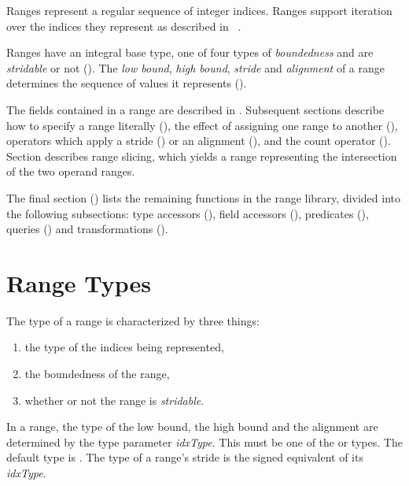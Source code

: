 \label{Ranges}

Ranges represent a regular sequence of integer indices.  
Ranges support iteration over the
indices they represent as described in ~.

Ranges have an integral base type, one of four types of \emph{boundedness} and
are \emph{stridable} or not ().  The \emph{low
bound}, \emph{high bound}, \emph{stride} and \emph{alignment} of a range
determines the sequence of values it represents ().

The fields contained in a range are described in .
Subsequent sections describe how to specify a range literally
(), the effect of assigning one range to another
(), operators which apply a stride
() or an alignment (), and the
count operator ().  Section  describes
range slicing, which yields a range representing the intersection of the two
operand ranges.

The final section () lists the remaining
functions in the range library, divided into the following subsections: type
accessors (), field accessors
(), predicates (), queries
() and transformations ().

\section{Range Types}
\label{Range_Types}

The type of a range is characterized by three things:
\begin{enumerate}
\item the type of the indices being represented, 
\item the boundedness of the range,
\item whether or not the range is \emph{stridable}.
\end{enumerate}


In a range, the type of the low bound, the high bound and the alignment are
determined by the type parameter \emph{idxType}.
This must be one of the  or
 types.  The default type is .
The type of a range's stride is the signed equivalent of its \emph{idxType}.

